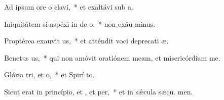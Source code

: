 \item Ad ipsum ore o clavi,~* et exaltávi sub  a.
\item Iniquitátem si aspéxi in de o,~* non exáu minus.
\item Proptérea exauvit us,~* et atténdit voci deprecati æ.
\item Benetus us,~* qui non amóvit oratiónem meam, et misericórdiam   me.
\item Glória tri, et o,~* et Spirí to.
\item Sicut erat in princípio, et , et per,~* et in sǽcula sæcu. men.
